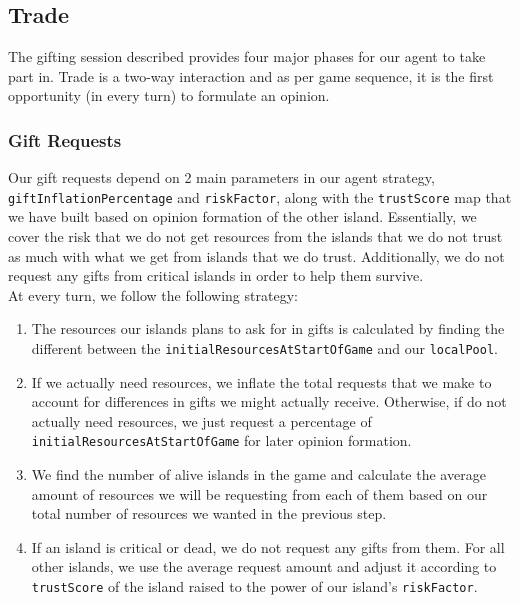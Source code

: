 \subsection{Trade}

The gifting session described provides four major phases for our agent to take part in. Trade is a two-way interaction and as per game sequence, it is the first opportunity (in every turn) to formulate an opinion.

\subsubsection{Gift Requests}
Our gift requests depend on 2 main parameters in our agent strategy, \texttt{giftInflationPercentage} and \texttt{riskFactor}, along with the \texttt{trustScore} map that we have built based on opinion formation of the other island. Essentially, we cover the risk that we do not get resources from the islands that we do not trust as much with what we get from islands that we do trust. Additionally, we do not request any gifts from critical islands in order to help them survive. \\

At every turn, we follow the following strategy:

\begin{enumerate}
    \item The resources our islands plans to ask for in gifts is calculated by finding the different between the \texttt{initialResourcesAtStartOfGame} and our \texttt{localPool}.
    \item If we actually need resources, we inflate the total requests that we make to account for differences in gifts we might actually receive. Otherwise, if do not actually need resources, we just request a percentage of \texttt{initialResourcesAtStartOfGame} for later opinion formation.
    \item We find the number of alive islands in the game and calculate the average amount of resources we will be requesting from each of them based on our total number of resources we wanted in the previous step.
    \item If an island is critical or dead, we do not request any gifts from them. For all other islands, we use the average request amount and adjust it according to \texttt{trustScore} of the island raised to the power of our island's \texttt{riskFactor}.
\end{enumerate}

